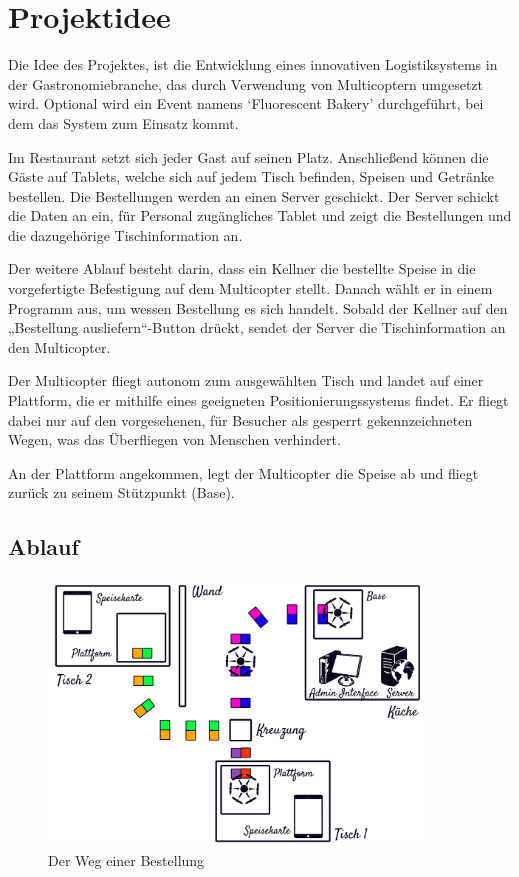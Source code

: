 \chapter{Projektidee}

\renewcommand{\kapitelautor}{}

Die Idee des Projektes, ist die Entwicklung eines innovativen Logistiksystems in der Gastronomiebranche, das durch Verwendung von Multicoptern umgesetzt wird.
Optional wird ein Event namens ‘Fluorescent Bakery’ durchgeführt, bei dem das System zum Einsatz kommt.

Im Restaurant setzt sich jeder Gast auf seinen Platz. Anschließend können die Gäste auf Tablets, welche sich auf jedem Tisch befinden, Speisen und Getränke bestellen. Die Bestellungen werden an einen Server geschickt. Der Server schickt die Daten an ein, für Personal zugängliches Tablet und zeigt die Bestellungen und die dazugehörige Tischinformation an.

Der weitere Ablauf besteht darin, dass ein Kellner die bestellte Speise in die vorgefertigte Befestigung auf dem Multicopter stellt. Danach wählt er in einem Programm aus, um wessen Bestellung es sich handelt. Sobald der Kellner auf den „Bestellung ausliefern“-Button drückt, sendet der Server die Tischinformation an den Multicopter.

Der Multicopter fliegt autonom zum ausgewählten Tisch und landet auf einer Plattform, die er mithilfe eines geeigneten Positionierungssystems findet. Er fliegt dabei nur auf den vorgesehenen, für Besucher als gesperrt gekennzeichneten Wegen, was das Überfliegen von Menschen verhindert.

An der Plattform angekommen, legt der Multicopter die Speise ab und fliegt zurück zu seinem Stützpunkt (Base).
\section{Ablauf}

\begin{figure}[tbh]
\begin{centering}
\includegraphics[width = 100mm]{Bilder/Ablauf}
\par\end{centering}
\caption{Der Weg einer Bestellung}
\label{Ablauf}
\end{figure}

